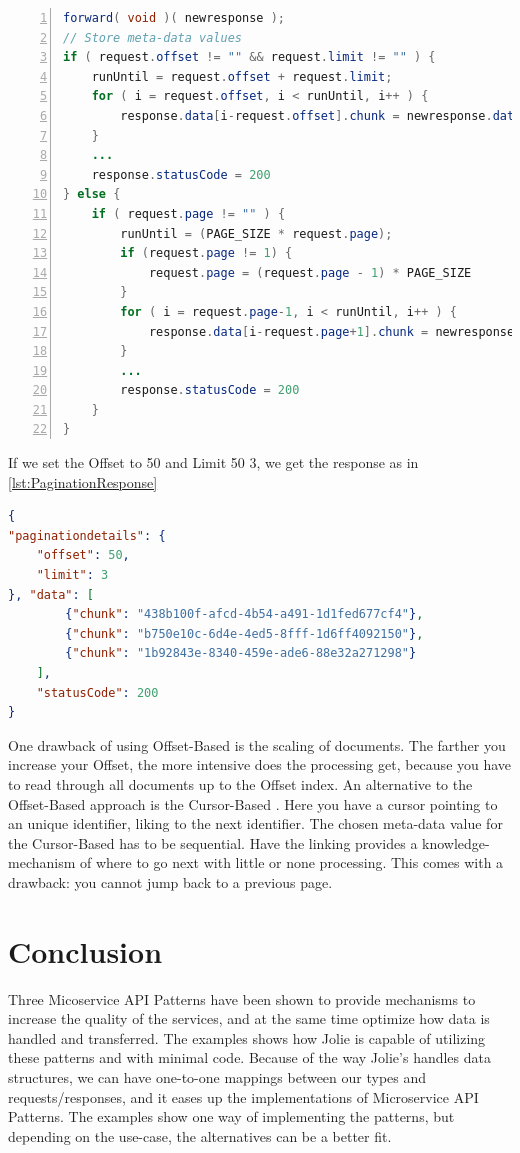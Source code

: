 \documentclass[12pt]{article}
\begin{document}
\begin{lstlisting}[caption=Courier operations for the Pagination Service, 
    captionpos=b, language=java, label=paginationCourier, frame=single, breaklines=true, numbers=left]
forward( void )( newresponse );
// Store meta-data values
if ( request.offset != "" && request.limit != "" ) {
    runUntil = request.offset + request.limit;
    for ( i = request.offset, i < runUntil, i++ ) {
        response.data[i-request.offset].chunk = newresponse.data[i].chunk
    }
    ...
    response.statusCode = 200
} else {
    if ( request.page != "" ) {
        runUntil = (PAGE_SIZE * request.page);
        if (request.page != 1) {
            request.page = (request.page - 1) * PAGE_SIZE
        }
        for ( i = request.page-1, i < runUntil, i++ ) {
            response.data[i-request.page+1].chunk = newresponse.data[i].chunk
        }
        ...
        response.statusCode = 200
    }
}   
\end{lstlisting}

If we set the Offset to 50 and Limit 50 3, we get the response as in \ref{lst:PaginationResponse}

\begin{lstlisting}[caption=The response to the client based on Offset and Limit meta-data, 
    captionpos=b, language=json, label=PaginationResponse]
{
"paginationdetails": {
    "offset": 50,
    "limit": 3
}, "data": [
        {"chunk": "438b100f-afcd-4b54-a491-1d1fed677cf4"},
        {"chunk": "b750e10c-6d4e-4ed5-8fff-1d6ff4092150"},
        {"chunk": "1b92843e-8340-459e-ade6-88e32a271298"}
    ],
    "statusCode": 200
}
\end{lstlisting}

One drawback of using Offset-Based is the scaling of documents. The farther you increase your Offset, the more intensive does the processing get, because you have to read through all documents up to the Offset index. An alternative to the Offset-Based approach is the Cursor-Based \cite{CursorBased:1}. Here you have a cursor pointing to an unique identifier, liking to the next identifier. The chosen meta-data value for the Cursor-Based has to be sequential. Have the linking provides a knowledge-mechanism of where to go next with little or none processing. This comes with a drawback: you cannot jump back to a previous page. 

\section{Conclusion}

Three Micoservice API Patterns have been shown to provide mechanisms to increase the quality of the services, and at the same time optimize how data is handled and transferred. The examples shows how Jolie is capable of utilizing these patterns and with minimal code. Because of the way Jolie's handles data structures, we can have one-to-one mappings between our types and requests/responses, and it eases up the implementations of Microservice API Patterns. The examples show one way of implementing the patterns, but depending on the use-case, the alternatives can be a better fit. 

\newpage


\end{document}
